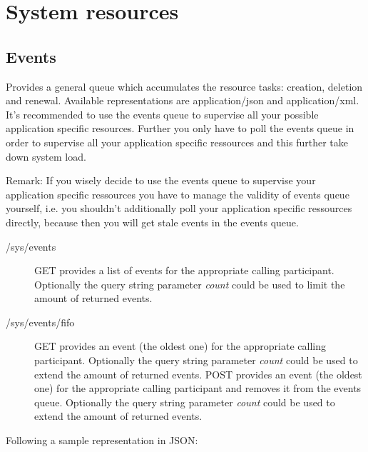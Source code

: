 \hypertarget{system_resources}{}
\section{System resources}%
%

\hypertarget{events_resource}{}
\subsection{Events}%
%
Provides a general queue which accumulates the resource tasks: creation,
deletion and renewal. Available representations are application/json and
application/xml. It's recommended to use the events queue to supervise all your
possible application specific resources. Further you only have to poll the
events queue in order to supervise all your application specific ressources and
this further take down system load. 

Remark: If you wisely decide to use the events queue to supervise your
application specific ressources you have to manage the validity of events queue
yourself, i.e. you shouldn't additionally poll your application specific
ressources directly, because then you will get stale events in the events
queue. 
\begin{description}
  \item[/sys/events] GET provides a list of events for the appropriate calling
  participant. Optionally the query string parameter \textit{count} could be used
  to limit the amount of returned events. 
  \item[/sys/events/fifo] GET provides an event (the oldest one) for the
  appropriate calling participant. Optionally the query string parameter
  \textit{count} could be used to extend the amount of returned events.  POST
  provides an event (the oldest one) for the appropriate calling participant
  and removes it from the events queue. Optionally the query string parameter
  \textit{count} could be used to extend the amount of returned events.
\end{description}
Following a sample representation in JSON:
\begin{code}
\end{code}

\hypertarget{memberships_resource}{}
